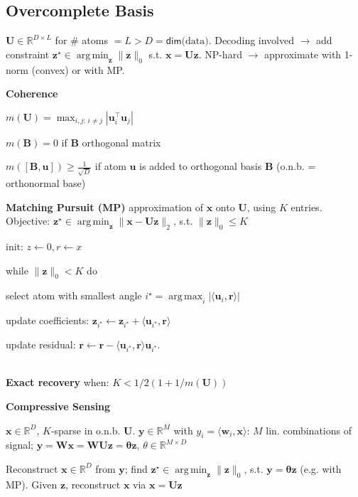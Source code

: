 \documentclass[a4paper, 11pt, landscape]{article}
\DeclareMathOperator*{\argmin}{arg\,min}
\DeclareMathOperator*{\argmax}{arg\,max}
\begin{document}
\begin{multicols*}{3}
\subsection{Overcomplete Basis}
$\mathbf{U} \in \mathbb{R}^{D \times  L}$ for \# atoms $ = L > D = \mathsf{dim}\text{(data)}$. Decoding involved $\rightarrow$ add constraint $\mathbf{z}^\star \in \argmin_\mathbf{z} \lVert \mathbf{z} \rVert_0$ s.t. $\mathbf{x} = \mathbf{Uz}$. NP-hard $\rightarrow$ approximate with 1-norm (convex) or with MP.

\textbf{Coherence}
\begin{inparaitem}[\color{red}\textbullet]
	\item $m(\mathbf{U}) = \max_{i,j:\, i \neq j} | \mathbf{u}_i^\top \mathbf{u}_j |$
	\item $m(\mathbf{B}) = 0$ if $\mathbf{B}$ orthogonal matrix
	\item $m([\mathbf{B}, \mathbf{u}]) \geq \frac{1}{\sqrt{D}}$ if atom $\mathbf{u}$ is added to orthogonal basis $\mathbf{B}$ (o.n.b. = orthonormal base)
\end{inparaitem}

\textbf{Matching Pursuit (MP)}
approximation of $\mathbf{x}$ onto $\mathbf{U}$, using $K$ entries.
Objective: $\mathbf{z}^\star \in \argmin_{\mathbf{z}} \|\mathbf{x} - \mathbf{Uz} \|_2$, s.t. $\|\mathbf{z}\|_0 \leq K$
\begin{inparaenum}
	\item init: $z \leftarrow 0, r \leftarrow x$
	\item while $\|\mathbf{z}\|_0 < K$ do
	\item select atom with smallest angle $i^\star = \argmax_i |\langle \mathbf{u}_i, \mathbf{r} \rangle|$
	\item update coefficients: $\mathbf{z}_{i^\star} \leftarrow \mathbf{z}_{i^\star} + \langle \mathbf{u}_{i^\star}, \mathbf{r} \rangle$
	\item update residual: $\mathbf{r} \leftarrow \mathbf{r} - \langle \mathbf{u}_{i^\star}, \mathbf{r} \rangle \mathbf{u}_{i^\star}$.
\end{inparaenum}
\\\textbf{Exact recovery} when: $K<1/2( 1+1/m(\mathbf{U}))$

\textbf{Compressive Sensing}
\begin{inparaitem}[\color{red}\textbullet]
  \item $\mathbf{x} \in \mathbb{R}^D$, $K$-sparse in o.n.b. $\mathbf{U}$. $\mathbf{y} \in \mathbb{R}^M$ with $y_i = \langle \mathbf{w}_i, \mathbf{x}\rangle $: $M$ lin. combinations of signal; $\mathbf{y} = \mathbf{Wx} = \mathbf{WUz} = \mathbf{\theta z}$, $\theta \in \mathbb{R}^{M \times D}$
  \item Reconstruct $\mathbf{x} \in \mathbb{R}^D$ from $\mathbf{y}$; find $\mathbf{z}^\star \in \argmin_{\mathbf{z}}\|\mathbf{z}\|_0$, s.t. $\mathbf{y} = \mathbf{\theta z}$ (e.g. with MP). Given $\mathbf{z}$, reconstruct $\mathbf{x}$ via $\mathbf{x} = \mathbf{Uz}$
\end{inparaitem}


\end{multicols*}
\end{document}
